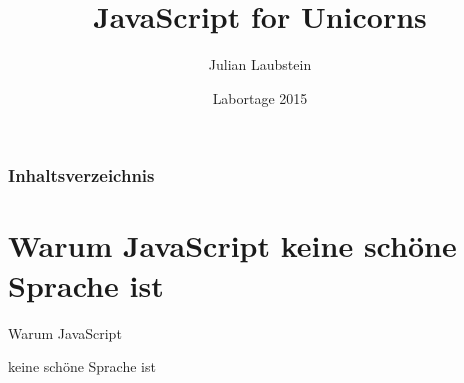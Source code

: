 \documentclass{beamer}
\title[Short title]{JavaScript for Unicorns} %
\author{Julian Laubstein} %
\institute[UCLA] %
{
\medskip
\textit{julianlaubstein@yahoo.de} %
}
\date{Labortage 2015} %
\begin{document}
\begin{frame}
\titlepage %
\end{frame}

\begin{frame}
\frametitle{Inhaltsverzeichnis} %
\tableofcontents %
\end{frame}


\section{Warum JavaScript keine schöne Sprache ist} %

\begin{frame}
\Huge{
\centerline{Warum JavaScript}
\centerline{keine schöne Sprache ist}
}
\end{frame}

\end{document}
